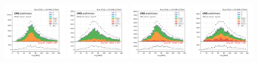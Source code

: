 \begin{figure}
    \includegraphics[width=0.24\textwidth]{appendices/qcdSF/figures/mutau_==1_==0_dilepton_mass.png}
    \includegraphics[width=0.24\textwidth]{appendices/qcdSF/figures/mutau_ss_==1_==0_dilepton_mass.png}
    \includegraphics[width=0.24\textwidth]{appendices/qcdSF/figures/etau_==1_==0_dilepton_mass.png}
    \includegraphics[width=0.24\textwidth]{appendices/qcdSF/figures/etau_ss_==1_==0_dilepton_mass.png}
    

\end{figure}
